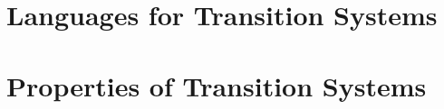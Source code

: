 \documentclass[11pt]{article}
\begin{document}
\section{Languages for Transition Systems} %
\label{sec:languages_for_transition_systems}



\section{Properties of Transition Systems} %
\label{sec:properties_of_transition_systems}



\end{document}
